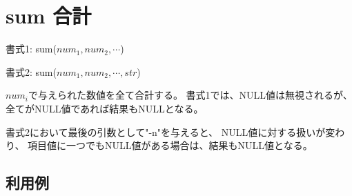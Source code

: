 
%

\section{sum 合計\label{sect:sum}}

書式1: sum($num_1,num_2,\cdots$)

書式2: sum($num_1,num_2,\cdots,str$)

$num_i$で与えられた数値を全て合計する。
書式1では、NULL値は無視されるが、全てがNULL値であれば結果もNULLとなる。

書式2において最後の引数として"-n"を与えると、
NULL値に対する扱いが変わり、
項目値に一つでもNULL値がある場合は、結果もNULL値となる。

\subsection*{利用例}


%
